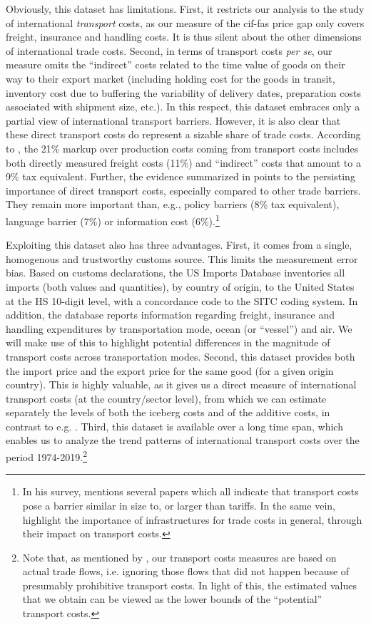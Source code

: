 \documentclass[a4paper,11pt]{article}
\begin{document}
Obviously, this dataset has limitations.
First, it restricts our analysis to the study of international \emph{transport} costs, as our measure of the cif-fas price gap only covers freight, insurance and handling costs.
It is thus silent about the other dimensions of international trade costs.
Second, in terms of transport costs \textit{per se}, our measure omits the ``indirect'' costs related to the time value of goods on their way to their export market (including holding cost for the goods in transit, inventory cost due to buffering the variability of delivery dates, preparation costs associated with shipment size, etc.).
In this respect, this dataset embraces only a partial view of international transport barriers.
However, it is also clear that these direct transport costs do represent a sizable share of trade costs.
According to \cite{anderson_wincoop_jel}, the 21\% markup over production costs coming from transport costs includes both directly measured freight costs (11\%) and ``indirect'' costs that amount to a  9\% tax equivalent.
Further, the evidence summarized in \cite{anderson_wincoop_jel} points to the persisting importance of direct transport costs, especially compared to other trade barriers.
They remain more important than, e.g., policy barriers (8\% tax equivalent), language barrier (7\%) or information cost (6\%).\footnote{In his survey, \cite{Hummels_1999} mentions several papers which all indicate that transport costs pose a barrier similar in size to, or larger than tariffs.
In the same vein, \cite{limao_venables} highlight the importance of infrastructures for trade costs in general, through their impact on transport costs.}

Exploiting this dataset also has three advantages.
First, it comes from a single, homogenous and trustworthy customs source.
This limits the measurement error bias.
Based on customs declarations, the US Imports Database inventories all imports (both values and quantities), by country of origin, to the United States at the HS 10-digit level, with a concordance code to the SITC coding system. In addition, the database reports information regarding freight, insurance and handling expenditures by transportation mode, ocean (or ``vessel'') and air. We will make use of this to highlight potential differences in the magnitude of transport costs across transportation modes.
Second, this dataset provides both the import price and the export price for the same good (for a given origin country).
This is highly valuable, as it gives us a direct measure of international transport costs (at the country/sector level), from which we can estimate separately the levels of both the iceberg costs and of the additive costs, in contrast to e.g. \cite{Irrazabal_2015}.
Third, this dataset is available over a long time span, which enables us to analyze the trend patterns of international transport costs over the period 1974-2019.\footnote{Note that, as mentioned by \cite{Lafourcade_Thisse}, our transport costs measures are based on actual trade flows, i.e. ignoring those flows that did not happen because of presumably prohibitive transport costs.
In light of this, the estimated values that we obtain can be viewed as the lower bounds of the ``potential'' transport costs.} \smallskip
\end{document}
